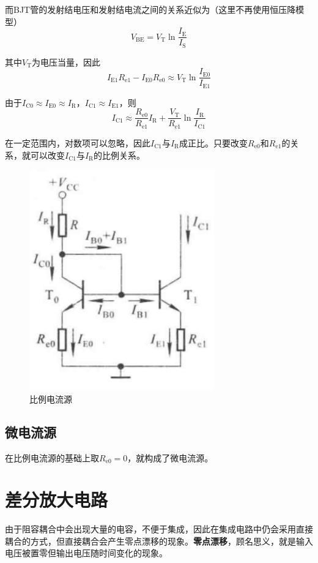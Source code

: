 而BJT管的发射结电压和发射结电流之间的关系近似为（这里不再使用恒压降模型）
\begin{equation}
    V_{\mathrm{BE}}=V_{\mathrm{T}}\ln \frac{I_{\mathrm{E}}}{I_{\mathrm{S}}}
\end{equation}

其中$V_{\mathrm{T}}$为电压当量，因此
\begin{equation}
    I_{\mathrm{E1}}R_{\mathrm{e1}}-I_{\mathrm{E0}}R_{\mathrm{e0}}\approx V_{\mathrm{T}}\ln \frac{I_{\mathrm{E0}}}{I_{\mathrm{E1}}}
\end{equation}

由于$I_{\mathrm{C0}}\approx I_{\mathrm{E0}}\approx I_{\mathrm{R}}$，$I_{\mathrm{C1}}\approx I_{\mathrm{E1}}$，则
\begin{equation}
    I_{\mathrm{C1}}\approx \frac{R_{\mathrm{e0}}}{R_{\mathrm{e1}}}I_\mathrm{R}+\frac{V_{\mathrm{T}}}{R_{\mathrm{e1}}}\ln \frac{I_{\mathrm{R}}}{I_{\mathrm{C1}}}
\end{equation}

在一定范围内，对数项可以忽略，因此$I_{\mathrm{C1}}$与$I_{\mathrm{R}}$成正比。只要改变$R_{\mathrm{e0}}$和$R_{\mathrm{e1}}$的关系，就可以改变$I_{\mathrm{C1}}$与$I_{\mathrm{R}}$的比例关系。

\begin{figure}[htb]
    \centering
    \includegraphics[width=0.3\linewidth]{pic/比例电流源.png}
    \caption{比例电流源\cite{华成英}\label{比例电流源}}
\end{figure}

\subsection{微电流源}
在比例电流源的基础上取$R_{\mathrm{e0}}=0$，就构成了微电流源。

\section{差分放大电路}
由于阻容耦合中会出现大量的电容，不便于集成，因此在集成电路中仍会采用直接耦合的方式，但直接耦合会产生零点漂移的现象。\textbf{零点漂移}，顾名思义，就是输入电压被置零但输出电压随时间变化的现象。

